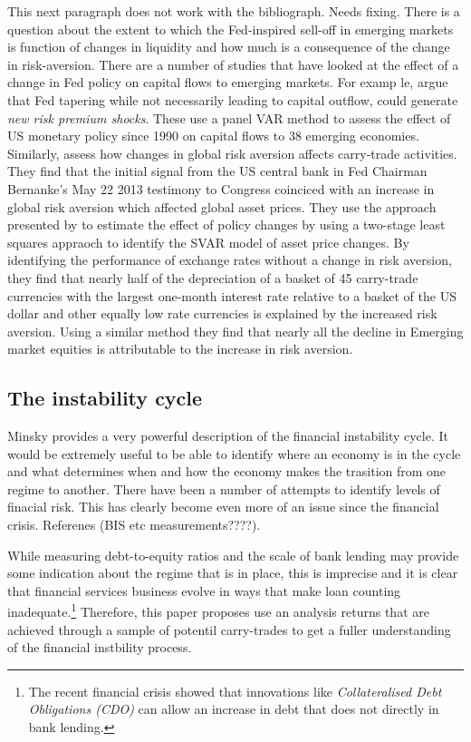 \documentclass[12pt, a4paper, oneside]{article} %
\begin{document}
This next paragraph does not work with the bibliograph.  Needs fixing. 
There is a question about the extent to which the Fed-inspired sell-off in emerging markets is function of changes in liquidity and how much is a consequence of the change in risk-aversion. There are a number of studies that have looked at the effect of a change in Fed policy on capital flows to emerging markets.  For examp le, \citet{IMFLatam} argue that Fed tapering while not necessarily leading to capital outflow, could generate \emph{new risk premium shocks}.  These use a panel VAR method to assess the effect of US monetary policy since 1990 on capital flows to 38 emerging economies.  Similarly, \citet{NYFedtaper} assess how changes in global risk aversion affects carry-trade activities.  They find that the initial signal from the US central bank in Fed Chairman Bernanke's May 22 2013 testimony to Congress coinciced with an increase in global risk aversion which affected global asset prices. They use the approach presented by \citet{MertensSVAR} to estimate the effect of policy changes by using a two-stage least squares appraoch to identify the SVAR model of asset price changes.  By identifying the performance of exchange rates without a change in risk aversion, they find that nearly half of the depreciation of a basket of 45 carry-trade currencies with the largest one-month interest rate relative to a basket of the US dollar and other equally low rate currencies is explained by the increased risk aversion. Using a similar method they find that nearly all the decline in Emerging market equities is attributable to the increase in risk aversion.

\subsection{The instability cycle}
Minsky provides a very powerful description of the financial instability cycle.  It would be extremely useful to be able to identify where an economy is in the cycle and what determines when and how the economy makes the trasition from one regime to another.  There have been a number of attempts to identify levels of finacial risk.  This has clearly become even more of an issue since the financial crisis. Referenes (BIS etc measurements????).

While measuring debt-to-equity ratios and the scale of bank lending may provide some indication about the regime that is in place, this is imprecise and it is clear that financial services business evolve in ways that make loan counting  inadequate.\footnote{The recent financial crisis showed that innovations like \emph{Collateralised Debt Obligations (CDO)} can allow an increase in debt that does not directly in bank lending.}   Therefore, this paper proposes use an analysis returns that are achieved through a sample of potentil carry-trades to get a fuller understanding of the financial instbility process.  
\end{document}
